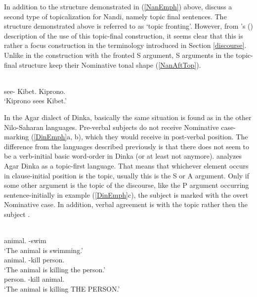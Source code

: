 In addition to the structure demonstrated in (\ref{NanEmph}) above, \citet[124--125]{Creider:1989} discuss a second type of topicalization for Nandi, namely topic final sentences. 
The structure demonstrated above is referred to as `topic fronting'. 
However, from \citeauthor{Creider:1989}'s (\citeyear[150]{Creider:1989}) description of the use of this topic-final construction, it seems clear that this is rather a focus construction in the terminology introduced in Section \ref{discourse}.
Unlike in the construction with the fronted S argument, S arguments in the topic-final structure keep their Nominative tonal shape (\ref{NanAftTop}).


\begin{exe}\ex\label{NanAftTop}
\gll{}  \\
see-\ipfv{} Kibet.\acc{} Kiprono.\nom{}\\
\glt `Kiprono sees  Kibet.'
\end{exe}

In the Agar dialect of Dinka, basically the same situation  is found as in the other Nilo-Saharan languages. 
Pre-verbal subjects do not receive Nominative case-marking (\ref{DinEmph}a, b), which they would receive in post-verbal position. 
The difference from the languages described previously is that there does not seem to be a verb-initial basic word-order in Dinka (or at least not anymore).  
\citet{Andersen:1991} analyzes Agar Dinka as a topic-first language. 
That means that whichever element occurs in clause-initial position is the topic, usually this is the S or A argument. 
Only if some other argument is the topic of the discourse, like the P argument occurring sentence-initially in example (\ref{DinEmph}c), the subject is marked with the overt Nominative case. 
In addition, verbal agreement is with the topic rather then the subject \citep{Andersen:1991}. 

\begin{exe}\ex\label{DinEmph}
\begin{xlist} 
\ex\gll {} \\
animal.\acc{} \decl{}-swim\\
\glt `The animal is swimming.'
\ex\gll {}  \\
animal.\acc{} \decl{}-kill person.\acc{}\\
\glt `The animal is killing the person.'
\ex\gll {}  \\
person.\acc{} \decl{}-kill animal.\nom{}\\
\glt `The animal is killing THE PERSON.' 
\end{xlist}
\end{exe}

